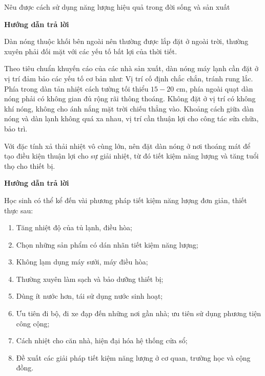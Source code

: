 \begin{dang}{Nêu được cách sử dụng năng lượng hiệu quả trong đời sống và sản xuất}
	{	\begin{center}
			\textbf{Hướng dẫn trả lời}
		\end{center}
		
		Dàn nóng thuộc khối bên ngoài nên thường được lắp đặt ở ngoài trời, thường xuyên phải đối mặt với các yếu tố bất lợi của thời tiết.
		
		Theo tiêu chuẩn khuyến cáo của các nhà sản xuất, dàn nóng máy lạnh cần đặt ở vị trí đảm bảo các yếu tố cơ bản như: Vị trí cố định chắc chắn, tránh rung lắc. Phía trong dàn tản nhiệt cách tường tối thiểu $15 - 20 \text{ cm}$, phía ngoài quạt dàn nóng phải có không gian đủ rộng rãi thông thoáng. Không đặt ở vị trí có không khí nóng, không cho ánh nắng mặt trời chiếu thẳng vào. Khoảng cách giữa dàn nóng và dàn lạnh không quá xa nhau, vị trí cần thuận lợi cho công tác sửa chữa, bảo trì.
		
		Với đặc tính xả thải nhiệt vô cùng lớn, nên đặt dàn nóng ở nơi thoáng mát để tạo điều kiện thuận lợi cho sự giải nhiệt, từ đó tiết kiệm năng lượng và tăng tuổi thọ cho thiết bị.
	}
	{	\begin{center}
			\textbf{Hướng dẫn trả lời}
		\end{center}
		
		Học sinh có thể kể đến vài phương pháp tiết kiệm năng lượng đơn giản, thiết thực sau:
		\begin{enumerate}
			\item Tăng nhiệt độ của tủ lạnh, điều hòa;
			\item Chọn những sản phẩm có dán nhãn tiết kiệm năng lượng;
			\item Không lạm dụng máy sưởi, máy điều hòa;
			\item Thường xuyên làm sạch và bảo dưỡng thiết bị;
			\item Dùng ít nước hơn, tái sử dụng nước sinh hoạt;
			\item Ưu tiên đi bộ, đi xe đạp đến những nơi gần nhà; ưu tiên sử dụng phương tiện công cộng;
			\item Cách nhiệt cho căn nhà, hiện đại hóa hệ thống cửa sổ;
			\item Đề xuất các giải pháp tiết kiệm năng lượng ở cơ quan, trường học và cộng đồng.
		\end{enumerate}
	}
\end{dang}
